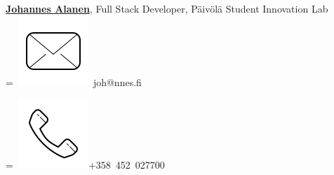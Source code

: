 \documentclass[]{plushcv}
\begin{document}
\begin{minipage}[t]{0.25\textwidth}
\href{https://www.linkedin.com/in/johannes-alanen}{\textbf{Johannes Alanen}}, Full Stack Developer, Päivölä Student Innovation Lab 
\\
\begingroup
{}=\hbox{
\includegraphics[scale=0.1,trim={0 1cm 0cm 0cm}]{icons/main/mail.png}\hspace{0.3cm} joh@nnes.fi
}
\parbox{\wd0}{}
\endgroup
\begingroup
{}=\hbox{
\includegraphics[scale=0.1,trim={0 1.25cm -0.4cm 0cm}]{icons/main/phone.png}\hspace{0.3cm}+358 452 027700
}
\parbox{\wd0}{}\endgroup
\\






\end{minipage} 
\end{document}
